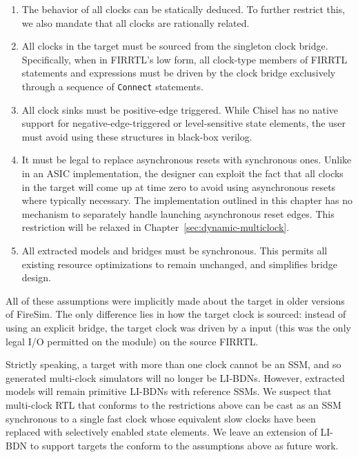 \begin{enumerate}
\item The behavior of all clocks can be statically deduced. To further restrict
    this, we also mandate that all clocks are rationally related.

\item All clocks in the target must be sourced from the singleton clock bridge.
    Specifically, when in FIRRTL's low form, all clock-type members of FIRRTL
    statements and expressions must be driven by the clock bridge
    exclusively through a sequence of \texttt{Connect} statements.

\item All clock sinks must be positive-edge triggered. While Chisel has no
    native support for negative-edge-triggered or level-sensitive state elements, the
    user must avoid using these structures in black-box verilog.

\item It must be legal to replace asynchronous resets with synchronous ones. Unlike in 
    an ASIC implementation, the designer can exploit the fact that all clocks
    in the target will come up at time zero to avoid using asynchronous
    resets where typically necessary. The implementation outlined in this chapter has no mechanism to
    separately handle launching asynchronous reset edges. This restriction
    will be relaxed in Chapter~\ref{sec:dynamic-multiclock}.
\item All extracted models and bridges must be synchronous. This permits all existing resource optimizations to remain unchanged,
    and simplifies bridge design.

\end{enumerate}

All of these assumptions were implicitly made about the target in
older versions of FireSim. The only difference lies in how the target clock is
sourced: instead of using an explicit bridge, the target clock was driven by a
input (this was the only legal I/O permitted on the module) on the source
FIRRTL.

Strictly speaking, a target with more than one clock cannot be an SSM, and so
generated multi-clock simulators will no longer be LI-BDNs. However, extracted
models will remain primitive LI-BDNs with reference SSMs.  We suspect that
multi-clock RTL that conforms to the restrictions above can be cast as an SSM
synchronous to a single fast clock whose equivalent slow clocks have been
replaced with selectively enabled state elements. We leave an extension of LI-BDN
to support targets the conform to the assumptions above as future work.

